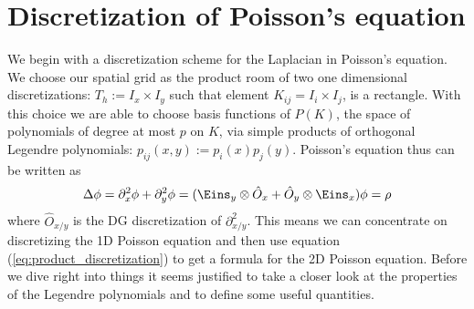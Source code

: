 \documentclass[a4paper,12pt]{scrartcl}
\renewcommand{\vec}[1]{{\mathbf{#1}}}
\begin{document}
%
%
%
\section{ Discretization of Poisson's equation}
We begin with a discretization scheme for the Laplacian in Poisson's equation.
We choose our spatial grid as the product room of two one dimensional
discretizations: $T_h := I_x \times I_y$ such that element $K_{ij} = I_i \times I_j$,
is a rectangle. With this choice we are able to choose basis functions 
of $P(K)$, the space of polynomials of degree at most $p$ on $K$, 
via simple products of orthogonal Legendre polynomials: 
$p_{ij}(x,y) := p_i(x) p_j(y)$. Poisson's equation thus can be written as
\begin{align}
    \Delta \phi = \partial_x^2 \phi + \partial_y^2 \phi = (\Eins_y \otimes \hat O_x + \hat O_y \otimes \Eins_x) \phi = \rho
    \label{eq:product_discretization}
\end{align}
where $\hat O_{x/y}$ is the DG discretization of $\partial_{x/y}^2$. This means we 
can concentrate on discretizing the 1D Poisson equation and then use
equation (\ref{eq:product_discretization}) to get a formula for the 2D Poisson 
equation.
Before we dive right into things it seems justified to take a closer look at the 
properties of the Legendre polynomials and to define some useful quantities.
\end{document}

